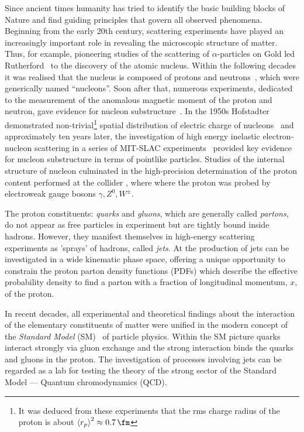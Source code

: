 Since ancient times humanity has tried to identify the basic building blocks of Nature and find guiding principles that govern all observed phenomena. Beginning from the early 20th century, scattering experiments have played an increasingly important role in revealing the microscopic structure of matter. Thus, for example, pioneering studies of the scattering of $\alpha$-particles on Gold led Rutherford~\cite{pm:21:669} to the discovery of the atomic nucleus. Within the following decades it was realised that the nucleus is composed of protons and neutrons~\cite{Chadwick:1932ma}, which were generically named ``nucleons''. Soon after that, numerous experiments, dedicated to the measurement of the anomalous magnetic moment of the proton and neutron, gave evidence for nucleon substructure~\cite{Frisch:1933, Bacher:1933, Alvarez:1940}. In the 1950s Hofstadter demonstrated non-trivial\footnote{It was deduced from these experiments that the rms charge radius of the proton is about $\left\langle r_{p} \right\rangle^2 \approx 0.7\,\fm$} spatial distribution of electric charge of nucleons~\cite{Hofstadter:1963} and approximately ten years later, the investigation of high energy inelastic electron-nucleon scattering in a series of MIT-SLAC experiments~\cite{Panofsky:1968pb, Bloom:1969kc, Briedenbach:1969, Taylor:1991ew, Kendall:1991np} provided key evidence for nucleon substructure in terms of pointlike particles. Studies of the internal structure of nucleon culminated in the high-precision determination of the proton content performed at the \ep collider \hera, where where the proton was probed by electroweak gauge bosons $\gamma, Z^0, W^{\pm}$.

The proton constituents: \emph{quarks} and \emph{gluons}, which are generally called \emph{partons}, do not appear as free particles in experiment but are tightly bound inside hadrons. However, they manifest themselves in high-energy scattering experiments as 'sprays' of hadrons, called \emph{jets}. At \hera the production of jets can be investigated in a wide kinematic phase space, offering a unique opportunity to constrain the proton parton density functions (PDFs) which describe the effective probability density to find a parton with a fraction of longitudinal momentum, $x$, of the proton.

In recent decades, all experimental and theoretical findings about the interaction of the elementary constituents of matter were unified in the modern concept of the \emph{Standard Model} (SM)~\cite{PDG:2014} of particle physics. Within the SM picture quarks interact strongly via gluon exchange and the strong interaction binds the quarks and gluons in the proton. The investigation of processes involving jets can be regarded as a lab for testing the theory of the strong sector of the Standard Model --- Quantum chromodynamics (QCD).

